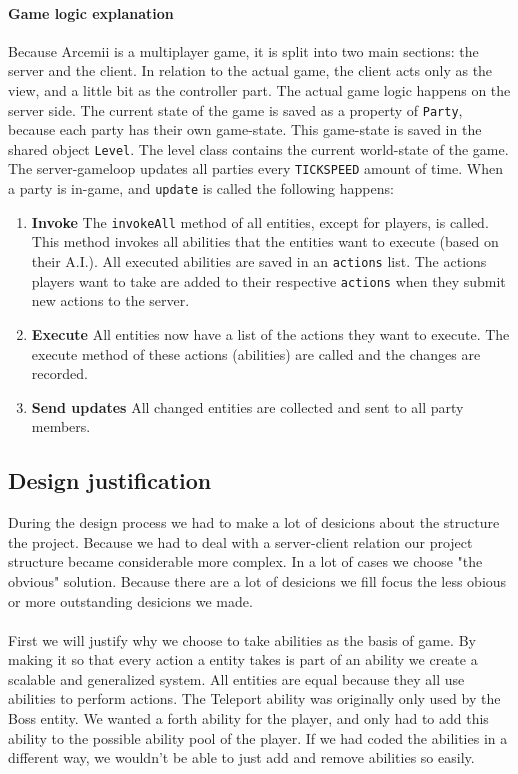 \documentclass[../main.tex]{subfiles}
\begin{document}
        \paragraph{Game logic explanation}
        Because Arcemii is a multiplayer game, it is split into two main sections: the server and the client. In relation to the actual game, the client acts only as the view, and a little bit as the controller part. The actual game logic happens on the server side. The current state of the game is saved as a property of \texttt{Party}, because each party has their own game-state. This game-state is saved in the shared object \texttt{Level}. The level class contains the current world-state of the game. The server-gameloop updates all parties every \texttt{TICKSPEED} amount of time. When a party is in-game, and \texttt{update} is called the following happens:

        \begin{enumerate}
            \item \textbf{Invoke} The \texttt{invokeAll} method of all entities, except for players, is called. This method invokes all abilities that the entities want to execute (based on their A.I.). All executed abilities are saved in an \texttt{actions} list. The actions players want to take are added to their respective \texttt{actions} when they submit new actions to the server.
            \item \textbf{Execute} All entities now have a list of the actions they want to execute. The execute method of these actions (abilities) are called and the changes are recorded.
            \item \textbf{Send updates} All changed entities are collected and sent to all party members.
        \end{enumerate}
        
    \pagebreak 
	\subsection{Design justification}
    During the design process we had to make a lot of desicions about the structure the project. Because we had to deal with a server-client relation our project structure became considerable more complex. In a lot of cases we choose "the obvious" solution. Because there are a lot of desicions we fill focus the less obious or more outstanding desicions we made.
    \paragraph{}
    First we will justify why we choose to take abilities as the basis of game. By making it so that every action a entity takes is part of an ability we create a scalable and generalized system. All entities are equal because they all use abilities to perform actions. The Teleport ability was originally only used by the Boss entity. We wanted a forth ability for the player, and only had to add this ability to the possible ability pool of the player. If we had coded the abilities in a different way, we wouldn't be able to just add and remove abilities so easily.
\end{document}
